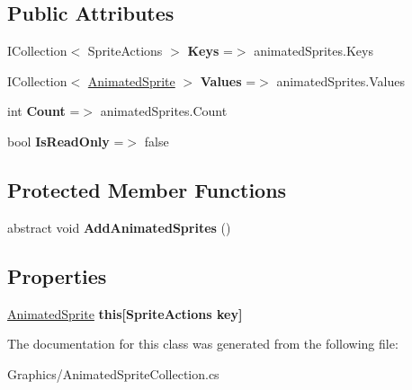 \subsection*{Public Attributes}
\begin{DoxyCompactItemize}
\item 
\mbox{\label{class_super_mario_1_1_graphics_1_1_animated_sprite_dictionary_a0bf6bcab7f15fe0c3a4f977a5c5d9d0d}} 
I\+Collection$<$ Sprite\+Actions $>$ {\bfseries Keys} =$>$ animated\+Sprites.\+Keys
\item 
\mbox{\label{class_super_mario_1_1_graphics_1_1_animated_sprite_dictionary_aaf91ddcf162555516aef5fe5b71e7551}} 
I\+Collection$<$ \mbox{\hyperlink{class_super_mario_1_1_graphics_1_1_animated_sprite}{Animated\+Sprite}} $>$ {\bfseries Values} =$>$ animated\+Sprites.\+Values
\item 
\mbox{\label{class_super_mario_1_1_graphics_1_1_animated_sprite_dictionary_a2f4220f8c46030c4d674be2feabcb954}} 
int {\bfseries Count} =$>$ animated\+Sprites.\+Count
\item 
\mbox{\label{class_super_mario_1_1_graphics_1_1_animated_sprite_dictionary_a8082d7ae6cf8e4df5bbe4be9816e2624}} 
bool {\bfseries Is\+Read\+Only} =$>$ false
\end{DoxyCompactItemize}
\subsection*{Protected Member Functions}
\begin{DoxyCompactItemize}
\item 
\mbox{\label{class_super_mario_1_1_graphics_1_1_animated_sprite_dictionary_ac413d262ece4b3e18b18691096ac81fe}} 
abstract void {\bfseries Add\+Animated\+Sprites} ()
\end{DoxyCompactItemize}
\subsection*{Properties}
\begin{DoxyCompactItemize}
\item 
\mbox{\label{class_super_mario_1_1_graphics_1_1_animated_sprite_dictionary_a16d79f77d8d8d24da7733ffb2e364316}} 
\mbox{\hyperlink{class_super_mario_1_1_graphics_1_1_animated_sprite}{Animated\+Sprite}} {\bfseries this\mbox{[}\+Sprite\+Actions key\mbox{]}}
\end{DoxyCompactItemize}


The documentation for this class was generated from the following file\+:\begin{DoxyCompactItemize}
\item 
Graphics/Animated\+Sprite\+Collection.\+cs\end{DoxyCompactItemize}
